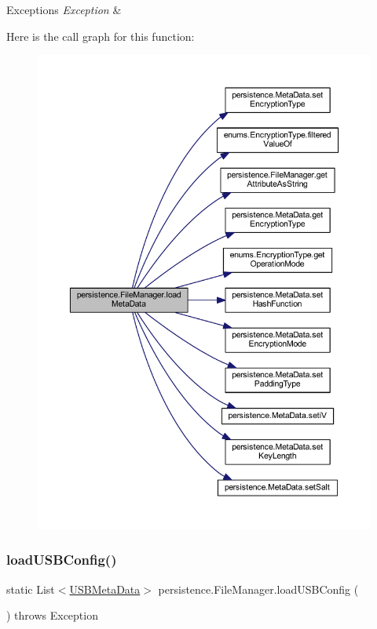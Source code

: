\begin{DoxyExceptions}{Exceptions}
{\em Exception} & \\
\hline
\end{DoxyExceptions}
Here is the call graph for this function\+:\nopagebreak
\begin{figure}[H]
\begin{center}
\leavevmode
\includegraphics[width=350pt]{classpersistence_1_1_file_manager_a4600d8fe734a758688b9b41688862aac_cgraph}
\end{center}
\end{figure}
\mbox{\label{classpersistence_1_1_file_manager_a5cc9f22a6f81dbba2ff9cbffd9e0c250}} 
\subsubsection{\texorpdfstring{load\+U\+S\+B\+Config()}{loadUSBConfig()}}
{\footnotesize\ttfamily static List$<$\mbox{\hyperlink{classpersistence_1_1_u_s_b_meta_data}{U\+S\+B\+Meta\+Data}}$>$ persistence.\+File\+Manager.\+load\+U\+S\+B\+Config (\begin{DoxyParamCaption}{ }\end{DoxyParamCaption}) throws Exception\hspace{0.3cm}{\ttfamily [static]}}

